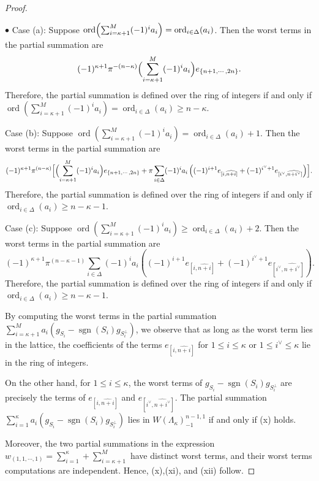 \documentclass[pdflatex,sn-mathphys-num]{sn-jnl}%
\theoremstyle{thmstyleone}%
\theoremstyle{thmstyletwo}%
\numberwithin{equation}{subsection}
\theoremstyle{thmstylethree}%
\DeclareMathOperator{\ord}{ord}
\DeclareMathOperator{\sgn}{sgn}
\newcommand{\wh}{\widehat}
\newenvironment{altitemize}
	{\begin{list}
			{$\bullet$}
			{\setlength{\labelwidth}{0pt}
				\setlength{\itemindent}{5pt}
				\setlength{\labelsep}{5pt}
				\setlength{\leftmargin}{0pt}
				\setlength{\itemsep}{\the\smallskipamount}
		}}
		{\end{list}}
\begin{document}
\begin{proof}
\begin{altitemize}
\noindent Case (a): Suppose $\ord\Bigl(\sum_{i=\kappa+1}^M (-1)^i a_i\Bigr)=\ord_{i\in\Delta}(a_i)$. Then the worst terms in the partial summation are
$$(-1)^{\kappa+1}\pi^{-(n-\kappa)}\Bigl(\sum_{i=\kappa+1}^M(-1)^ia_i\Bigr)e_{\{n+1,\cdots,2n\}}.$$
Therefore, the partial summation is defined over the ring of integers if and only if $\ord\left(\sum_{i=\kappa+1}^M (-1)^i a_i\right)=\ord_{i\in\Delta}(a_i)\geq n-\kappa$.

\noindent Case (b): Suppose $\ord\left(\sum_{i=\kappa+1}^M (-1)^i a_i\right)=\ord_{i\in\Delta}(a_i)+1$. Then the worst terms in the partial summation are
\begin{equation*}
    (-1)^{\kappa+1}\pi^{(n-\kappa)}\Bigl[\Bigl(\sum_{i=\kappa+1}^M(-1)^ia_i\Bigr)e_{\{n+1,\cdots,2n\}}+\pi\sum_{i\in\Delta} (-1)^i a_i\left((-1)^{i+1}e_{[i,\wh{n+i}]}+(-1)^{i^\vee+1}e_{[i^\vee,\wh{n+i^\vee}]}\right)\Bigr].
\end{equation*}
Therefore, the partial summation is defined over the ring of integers if and only if $\ord_{i\in\Delta}(a_i)\geq n-\kappa-1$.


\noindent Case (c): Suppose $\ord\left(\sum_{i=\kappa+1}^M (-1)^i a_i\right)\geq\ord_{i\in\Delta}(a_i)+2$. Then the worst terms in the partial summation are
\begin{equation*}
    (-1)^{\kappa+1}\pi^{(n-\kappa-1)}\sum_{i\in\Delta} (-1)^i a_i\left((-1)^{i+1}e_{[i,\wh{n+i}]}+(-1)^{i^\vee+1}e_{[i^\vee,\wh{n+i^\vee}]}\right).
\end{equation*}
Therefore, the partial summation is defined over the ring of integers if and only if $\ord_{i\in\Delta}(a_i)\geq n-\kappa-1$.
\end{altitemize}

By computing the worst terms in the partial summation
$\sum_{i=\kappa+1}^M a_i(g_{S_i}-\sgn(S_i)g_{S_i^\perp})$,
we observe that as long as the worst term lies in the lattice, the coefficients of the terms 
$e_{[i,\wh{n+i}]}$ for $1\leq i\leq \kappa$ or $1\leq i^\vee\leq \kappa$ lie in the ring of integers.

On the other hand, for $1\leq i\leq \kappa$, the worst terms of  $g_{S_i}-\sgn(S_i)g_{S_i^\perp}$ are precisely the terms of $e_{[i,\wh{n+i}]}$ and $e_{[i^\vee,\wh{n+i^\vee}]}$. 
The partial summation $\sum_{i=1}^\kappa a_i(g_{S_i}-\sgn(S_i)g_{S_i^\perp})$ lies in $W(\Lambda_\kappa)_{-1}^{n-1,1}$ if and only if (x) holds.

Moreover, the two partial summations in the expression $w_{(1,1,\cdots,1)}=\sum_{i=1}^\kappa+\sum_{i=\kappa+1}^M$ have distinct worst terms, and their worst terms computations are independent.
Hence, (x),(xi), and (xii) follow.
\end{proof}
		
\end{document}

